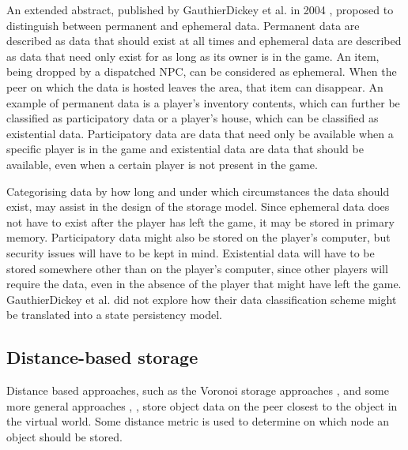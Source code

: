 \documentclass[10pt,a4paper,journal,cspaper,compsoc]{IEEEtran}
\begin{document}
An extended abstract, published by GauthierDickey et al. in 2004 \cite{hybrid_storage1}, proposed to distinguish between permanent and ephemeral
data. Permanent data are described as data that should exist at all times and ephemeral data are described as data that need only exist for as long
as its owner is in the game. An item, being dropped by a dispatched NPC, can be considered as ephemeral. When the peer on which the data is hosted
leaves the area, that item can disappear. An example of permanent data is a player's inventory contents, which can further be classified as
participatory data or a player's house, which can be classified as existential data. Participatory data are data that need only be available when a
specific player is in the game and existential data are data that should be available, even when a certain player is not present in the game.

Categorising data by how long and under which circumstances the data should exist, may assist in the design of the storage model. Since ephemeral
data does not have to exist after the player has left the game, it may be stored in primary memory. Participatory data might also be stored on the
player's computer, but security issues will have to be kept in mind. Existential data will have to be stored somewhere other than on the player's
computer, since other players will require the data, even in the absence of the player that might have left the game. GauthierDickey et al. did not
explore how their data classification scheme might be translated into a state persistency model.

\subsection{Distance-based storage}
\label{distance_based_storage}

Distance based approaches, such as the Voronoi storage approaches \cite{Buyukkaya_voronoi_state_management}, \cite{Hu_voronoi_IM} and some more
general approaches \cite{colyseus_distance_based}, \cite{solipsis}, store object data on the peer closest to the object in the virtual world. Some
distance metric is used to determine on which node an object should be stored.
\end{document}
